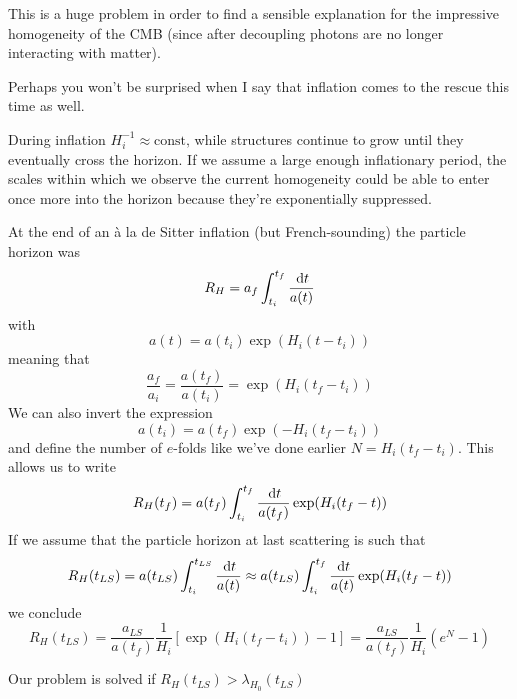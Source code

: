 \par This is a huge problem in order to find a sensible explanation for the impressive homogeneity of the CMB (since after decoupling photons are no longer interacting with matter).
\par Perhaps you won't be surprised when I say that inflation comes to the rescue this time as well.
\par During inflation $H_{i}^{-1}\approx \text{const,}$ while structures continue to grow until they eventually cross the horizon. If we assume a large enough inflationary period, the scales within which we observe the current homogeneity could be able to enter once more into the horizon because they're exponentially suppressed.
\par At the end of an à la de Sitter inflation (but French-sounding) the particle horizon was 
\begin{equation}
    R_{H} = a_{f}\int_{t_{i}}^{t_{f}}\frac{\,\text{d}t}{a(t)}
\end{equation}
with 
\begin{equation}
    a(t) = a(t_{i})\exp(H_{i}(t-t_{i}))
\end{equation}
meaning that 
\begin{equation}
    \frac{a_{f}}{a_{i}} = \frac{a(t_{f})}{a(t_{i})} = \exp(H_{i}(t_{f}-t_{i}))
\end{equation}
We can also invert the expression
\begin{equation}
    a(t_{i}) = a(t_{f})\exp(-H_{i}(t_{f}-t_{i}))
\end{equation}
and define the number of $e$-folds like we've done earlier $N = H_{i}(t_{f}-t_{i})$. This allows us to write 
\begin{equation}
    R_{H}(t_{f}) = a(t_{f})\int_{t_{i}}^{t_{f}} \frac{\,\text{d}t}{a(t_{f})}\exp(H_{i}(t_{f}-t))
\end{equation}
If we assume that the particle horizon at last scattering is such that 
\begin{equation}
    R_{H}(t_{LS}) = a(t_{LS})\int_{t_{i}}^{t_{LS}}\frac{\,\text{d}t}{a(t)} \approx a(t_{LS})\int_{t_{i}}^{t_{f}}\frac{\,\text{d}t}{a(t)}\exp(H_{i}(t_{f}-t))
\end{equation}
we conclude 
\begin{equation}
    \boxed{
        R_{H}(t_{LS}) = \frac{a_{LS}}{a(t_{f})}\frac{1}{H_{i}}\left[\exp(H_{i}(t_{f}-t_{i}))-1\right] = \frac{a_{LS}}{a(t_{f})}\frac{1}{H_{i}}(e^{N}-1)
    }
\end{equation}
\par Our problem is solved if $R_{H}(t_{LS}) > \lambda_{H_{0}}(t_{LS})$
